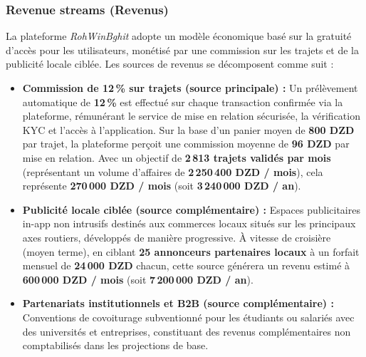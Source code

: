 \documentclass[11pt,a4paper]{article}
\begin{document}
\subsubsection{Revenue streams (Revenus)}
La plateforme \textit{RohWinBghit} adopte un modèle économique basé sur la gratuité d'accès pour les utilisateurs, monétisé par une commission sur les trajets et de la publicité locale ciblée. Les sources de revenus se décomposent comme suit :
\begin{itemize}[leftmargin=1.5em]
  \item \textbf{Commission de 12\,\% sur trajets (source principale) :} Un prélèvement automatique de \textbf{12\,\%} est effectué sur chaque transaction confirmée via la plateforme, rémunérant le service de mise en relation sécurisée, la vérification KYC et l'accès à l'application. Sur la base d'un panier moyen de \textbf{800 DZD} par trajet, la plateforme perçoit une commission moyenne de \textbf{96 DZD} par mise en relation. Avec un objectif de \textbf{2\,813 trajets validés par mois} (représentant un volume d'affaires de \textbf{2\,250\,400 DZD / mois}), cela représente \textbf{270\,000 DZD / mois} (soit \textbf{3\,240\,000 DZD / an}).
  \item \textbf{Publicité locale ciblée (source complémentaire) :} Espaces publicitaires in-app non intrusifs destinés aux commerces locaux situés sur les principaux axes routiers, développés de manière progressive. À vitesse de croisière (moyen terme), en ciblant \textbf{25 annonceurs partenaires locaux} à un forfait mensuel de \textbf{24\,000 DZD} chacun, cette source générera un revenu estimé à \textbf{600\,000 DZD / mois} (soit \textbf{7\,200\,000 DZD / an}).
  \item \textbf{Partenariats institutionnels et B2B (source complémentaire) :} Conventions de covoiturage subventionné pour les étudiants ou salariés avec des universités et entreprises, constituant des revenus complémentaires non comptabilisés dans les projections de base.
\end{itemize}
\end{document}
